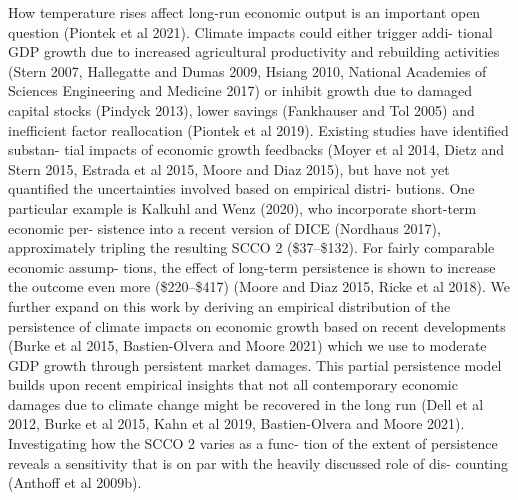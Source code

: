 \documentclass[
]{book}
\begin{document}
How temperature rises affect long-run economic
output is an important open question (Piontek et al
2021). Climate impacts could either trigger addi-
tional GDP growth due to increased agricultural
productivity and rebuilding activities (Stern 2007,
Hallegatte and Dumas 2009, Hsiang 2010, National
Academies of Sciences Engineering and Medicine
2017) or inhibit growth due to damaged capital
stocks (Pindyck 2013), lower savings (Fankhauser and
Tol 2005) and inefficient factor reallocation (Piontek
et al 2019). Existing studies have identified substan-
tial impacts of economic growth feedbacks (Moyer
et al 2014, Dietz and Stern 2015, Estrada et al 2015,
Moore and Diaz 2015), but have not yet quantified
the uncertainties involved based on empirical distri-
butions. One particular example is Kalkuhl and Wenz
(2020), who incorporate short-term economic per-
sistence into a recent version of DICE (Nordhaus
2017), approximately tripling the resulting SCCO 2
(\$37--\$132). For fairly comparable economic assump-
tions, the effect of long-term persistence is shown to
increase the outcome even more (\$220--\$417) (Moore
and Diaz 2015, Ricke et al 2018). We further expand
on this work by deriving an empirical distribution
of the persistence of climate impacts on economic
growth based on recent developments (Burke et al
2015, Bastien-Olvera and Moore 2021) which we use
to moderate GDP growth through persistent market
damages. This partial persistence model builds upon
recent empirical insights that not all contemporary
economic damages due to climate change might be
recovered in the long run (Dell et al 2012, Burke
et al 2015, Kahn et al 2019, Bastien-Olvera and Moore
2021). Investigating how the SCCO 2 varies as a func-
tion of the extent of persistence reveals a sensitivity
that is on par with the heavily discussed role of dis-
counting (Anthoff et al 2009b).
\end{document}

